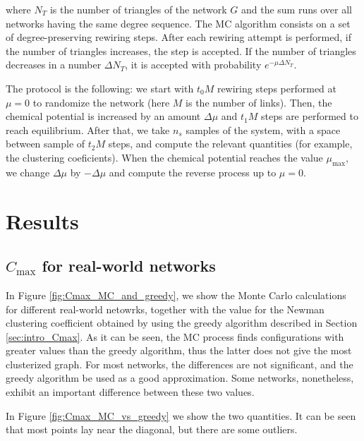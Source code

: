 \documentclass{article}
\begin{document}
where $N_T$ is the number of triangles of the network $G$ and the sum runs over all networks having the same degree sequence. The MC algorithm consists on a set of degree-preserving rewiring steps. After each rewiring attempt is performed, if the number of triangles increases, the step is accepted. If the number of triangles decreases in a number $\Delta N_T$, it is accepted with probability $e^{-\mu \Delta N_T}$.

The protocol is the following: we start with $t_0 M$ rewiring steps performed at $\mu = 0$ to randomize the network (here $M$ is the number of links). Then, the chemical potential is increased by an amount $\Delta \mu$ and $t_1 M$ steps are performed to reach equilibrium. After that, we take $n_s$ samples of the system, with a space between sample of $t_2 M$ steps, and compute the relevant quantities (for example, the clustering coeficients). When the chemical potential reaches the value $\mu_{\mathrm{max}}$, we change $\Delta \mu$ by $-\Delta \mu$ and compute the reverse process up to $\mu = 0$.


\section{Results}

\subsection{$C_{\mathrm{max}}$ for real-world networks}

In Figure \ref{fig:Cmax_MC_and_greedy}, we show the Monte Carlo calculations for different real-world netowrks, together with the value for the Newman clustering coefficient obtained by using the greedy algorithm described in Section \ref{sec:intro_Cmax}. As it can be seen, the MC process finds configurations with greater values than the greedy algorithm, thus the latter does not give the most clusterized graph. For most networks, the differences are not significant, and the greedy algorithm be used as a good approximation. Some networks, nonetheless, exhibit an important difference between these two values.

In Figure \ref{fig:Cmax_MC_vs_greedy} we show the two quantities. It can be seen that most points lay near the diagonal, but there are some outliers.
\end{document}
